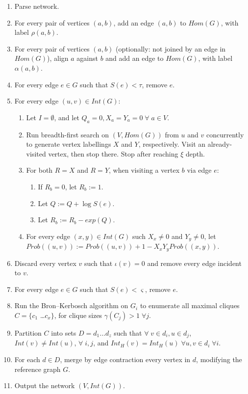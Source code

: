\documentclass[11pt]{article}
\begin{document}
\begin{enumerate}
\item Parse network.
\item For every pair of vertices $(a,b)$, add an edge $(a,b)$ to $Hom(G)$, with label $\rho(a,b)$.
\item For every pair of vertices $(a,b)$ (optionally: not joined by an edge in $Hom(G)$), align $a$ against $b$ and add an edge to $Hom(G)$, with label $\alpha(a,b)$.
\item For every edge $e \in G$ such that $S(e) < \tau$, remove $e$.
\item For every edge $(u,v) \in Int(G)$:
\begin{enumerate}
\item Let $I=\emptyset$, and let $Q_a = 0, X_a = Y_a = 0 \; \forall \; a \in V$.
\item Run breadth-first search on $(V, Hom(G))$ from $u$ and $v$ concurrently to generate vertex labellings $X$ and $Y$, respectively. Visit an already-visited vertex, then stop there. Stop after reaching $\xi$ depth.
\item For both $R=X$ and $R=Y$, when visiting a vertex $b$ via edge $e$:
\begin{enumerate}
\item If $R_b=0$, let $R_b := 1$.
\item Let $Q := Q + \log S(e)$.
\item Let $R_b := R_b - exp(Q)$.
\end{enumerate}
\item For every edge $(x,y) \in Int(G)$ such $X_x \neq 0$ and $Y_y \neq 0$, let $Prob((u,v)) := Prob((u,v)) + 1 - X_x Y_y Prob((x,y))$.
\end{enumerate}
\item Discard every vertex $v$ such that $\iota(v) = 0$ and remove every edge incident to $v$.
\item For every edge $e \in G$ such that $S(e) < \varsigma$, remove $e$.
\item Run the Bron--Kerbosch algorithm on $G_i$ to enumerate all maximal cliques $C = \{ c_1$ \ldots $c_x \}$, for clique sizes $\gamma(C_j) > 1 \; \forall j$.
\item Partition $C$ into sets $D = d_1 \ldots d_z$ such that $\forall \; v \in d_i, u \in d_j$, $Int(v) \neq Int(u)$, $\forall \; i,j$, and $Int_H(v) = Int_H(u) \; \forall u,v \in d_i \; \forall i$.
\item For each $d \in D$, merge by edge contraction every vertex in $d$, modifying the reference graph $G$.
\item Output the network $(V, Int(G))$.
\end{enumerate}
\end{document}
